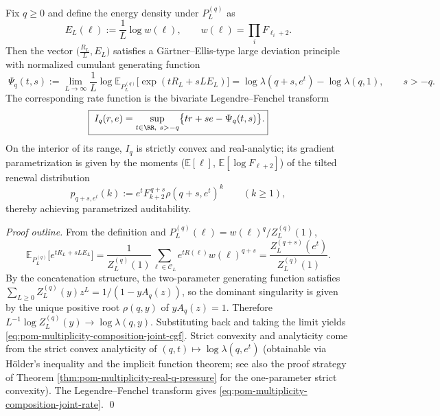 \begin{theorem}\label{thm:pom-multiplicity-composition-joint-ldp-partcount-energy}
Fix \(q\ge 0\) and define the energy density under \(P_L^{(q)}\) as
\[
E_L(\boldsymbol{\ell}):=\frac{1}{L}\log w(\boldsymbol{\ell}),
\qquad
w(\boldsymbol{\ell})=\prod_i F_{\ell_i+2}.
\]
Then the vector \(\bigl(\frac{R_L}{L},E_L\bigr)\) satisfies a G\"artner--Ellis-type large deviation principle with normalized cumulant generating function
\begin{equation}\label{eq:pom-multiplicity-composition-joint-cgf}
\boxed{\;
\Psi_q(t,s)
:=\lim_{L\to\infty}\frac{1}{L}\log \mathbb{E}_{P_L^{(q)}}\!\big[\exp(tR_L+sLE_L)\big]
=\log \lambda(q+s,e^{t})-\log\lambda(q,1),\qquad s>-q.}
\end{equation}
The corresponding rate function is the bivariate Legendre--Fenchel transform
\begin{equation}\label{eq:pom-multiplicity-composition-joint-rate}
\boxed{\;
I_q(r,e)=\sup_{t\in\RR,\ s>-q}\bigl\{tr+se-\Psi_q(t,s)\bigr\}.}
\end{equation}
On the interior of its range, \(I_q\) is strictly convex and real-analytic; its gradient parametrization is given by the moments (\(\mathbb{E}[\ell]\), \(\mathbb{E}[\log F_{\ell+2}]\)) of the tilted renewal distribution
\[
p_{q+s,e^t}(k):=e^{t}F_{k+2}^{\,q+s}\rho(q+s,e^t)^{k}\qquad(k\ge 1),
\]
thereby achieving parametrized auditability.
\end{theorem}
\begin{proof}[Proof outline]
From the definition and \(P_L^{(q)}(\boldsymbol{\ell})=w(\boldsymbol{\ell})^q/Z_L^{(q)}(1)\),
\[
\mathbb{E}_{P_L^{(q)}}\!\big[e^{tR_L+sLE_L}\big]
=\frac{1}{Z_L^{(q)}(1)}\sum_{\boldsymbol{\ell}\in\mathcal{C}_L}e^{tR(\boldsymbol{\ell})}w(\boldsymbol{\ell})^{q+s}
=\frac{Z_L^{(q+s)}(e^t)}{Z_L^{(q)}(1)}.
\]
By the concatenation structure, the two-parameter generating function satisfies
\(
\sum_{L\ge 0}Z_L^{(q)}(y)z^L=1/(1-yA_q(z))
\),
so the dominant singularity is given by the unique positive root \(\rho(q,y)\) of \(yA_q(z)=1\).
Therefore
\(
L^{-1}\log Z_L^{(q)}(y)\to \log\lambda(q,y)
\).
Substituting back and taking the limit yields \eqref{eq:pom-multiplicity-composition-joint-cgf}.
Strict convexity and analyticity come from the strict convex analyticity of \((q,t)\mapsto\log\lambda(q,e^t)\) (obtainable via H\"older's inequality and the implicit function theorem; see also the proof strategy of Theorem \ref{thm:pom-multiplicity-real-q-pressure} for the one-parameter strict convexity).
The Legendre--Fenchel transform gives \eqref{eq:pom-multiplicity-composition-joint-rate}. \qed
\end{proof}

